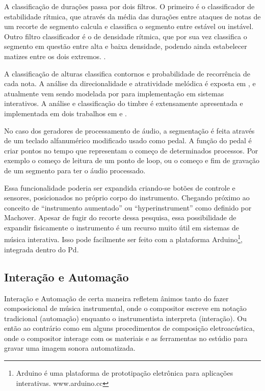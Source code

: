 \documentclass{ppgmus}
\begin{document}
A classificação de durações passa por dois filtros. O primeiro
é o classificador de estabilidade rítmica, que através da média das durações 
entre ataques de notas de um recorte de segmento calcula e classifica
o segmento entre estável ou instável.
Outro filtro classificador é o de densidade rítmica, que por sua vez classifica
o segmento em questão entre alta e baixa densidade, podendo ainda estabelecer
matizes entre os dois extremos. . 

A classificação de alturas classifica contornos e probabilidade de recorrência
de cada nota. A análise da direcionalidade e atratividade melódica é exposta em
\cite{lerdahl2001}, e atualmente vem sendo modelada por \cite{rickgrahan} para
implementação em sistemas interativos.
A análise e classificação do timbre é extensamente apresentada e implementada em dois
trabalhos em \cite{brentcepstral} e \cite{monteiro}.

No caso dos geradores de processamento de áudio, a segmentação é feita 
através de um teclado alfanumérico modificado usado como pedal. A função
do pedal é criar pontos no tempo que representam o começo de determinados
processos. Por exemplo o começo de leitura de um ponto de loop, ou o começo
e fim de gravação de um segmento para ter o áudio processado.

Essa funcionalidade poderia ser expandida criando-se botões de controle
e sensores, posicionados no próprio corpo do instrumento. Chegando próximo ao conceito
de ``instrumento aumentado'' ou ``hyperinstrument'' como definido por Machover\cite{hyperinstrumento}. 
Apesar de fugir do recorte dessa pesquisa, essa possibilidade
de expandir fisicamente o instrumento é um recurso muito útil em sistemas de
música interativa. Isso pode facilmente ser feito com a plataforma Arduino\footnote{Arduino
é uma plataforma de prototipação eletrônica para aplicações interativas.
www.arduino.cc}, integrada dentro do Pd. 




\subsection{Interação e Automação}

Interação e Automação de certa maneira refletem ânimos tanto do
fazer composicional de música instrumental, onde o compositor
escreve em notação tradicional (automação) enquanto o instrumentista
interpreta (interação). Ou então ao contrário como em alguns procedimentos
de composição eletroacústica, onde o compositor interage com os materiais
e as ferramentas no estúdio para gravar uma imagem sonora automatizada.
\end{document}
